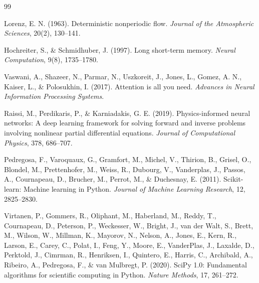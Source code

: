 \documentclass[a4paper,12pt]{article}
\begin{document}
\begin{thebibliography}{99}

Lorenz, E. N. (1963).
Deterministic nonperiodic flow.
\textit{Journal of the Atmospheric Sciences}, 20(2), 130--141.

Hochreiter, S., \& Schmidhuber, J. (1997).
Long short-term memory.
\textit{Neural Computation}, 9(8), 1735--1780.

Vaswani, A., Shazeer, N., Parmar, N., Uszkoreit, J., Jones, L., Gomez, A. N., Kaiser, L., \& Polosukhin, I. (2017).
Attention is all you need.
\textit{Advances in Neural Information Processing Systems}.

Raissi, M., Perdikaris, P., \& Karniadakis, G. E. (2019).
Physics-informed neural networks: A deep learning framework for solving forward and inverse problems involving nonlinear partial differential equations.
\textit{Journal of Computational Physics}, 378, 686--707.

Pedregosa, F., Varoquaux, G., Gramfort, M., Michel, V., Thirion, B., Grisel, O., Blondel, M., Prettenhofer, M., Weiss, R., Dubourg, V., Vanderplas, J., Passos, A., Cournapeau, D., Brucher, M., Perrot, M., \& Duchesnay, E. (2011).
Scikit-learn: Machine learning in Python.
\textit{Journal of Machine Learning Research}, 12, 2825--2830.

Virtanen, P., Gommers, R., Oliphant, M., Haberland, M., Reddy, T., Cournapeau, D., Peterson, P., Weckesser, W., Bright, J., van der Walt, S., Brett, M., Wilson, W., Millman, K., Mayorov, N., Nelson, A., Jones, E., Kern, R., Larson, E., Carey, C., Polat, I., Feng, Y., Moore, E., VanderPlas, J., Laxalde, D., Perktold, J., Cimrman, R., Henriksen, I., Quintero, E., Harris, C., Archibald, A., Ribeiro, A., Pedregosa, F., \& van Mulbregt, P. (2020).
SciPy 1.0: Fundamental algorithms for scientific computing in Python.
\textit{Nature Methods}, 17, 261--272.

\end{thebibliography}
\end{document}
